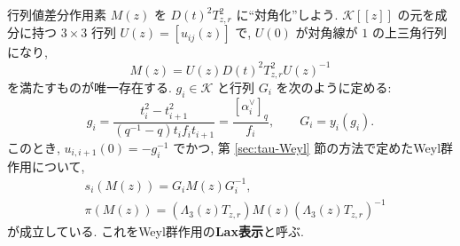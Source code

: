 \documentclass[12pt,twoside,dvipdfm]{msjproc}
\theoremstyle{definition} %
\theoremstyle{definition} %
\theoremstyle{definition} %
\numberwithin{theorem}{section}
\numberwithin{equation}{section}
\numberwithin{figure}{section}
\numberwithin{table}{section}
\newcommand\secref[1]{第 \ref{#1} 節}
\newcommand\K{\mathcal{K}}
\newcommand\av{\alpha^\vee}
\begin{document}
行列値差分作用素 $M(z)$ を $D(t)^2T_{z,r}^2$ に``対角化''しよう.
$\K[[z]]$ の元を成分に持つ $3\times 3$ 行列 $U(z)=[u_{ij}(z)]$ で, 
$U(0)$ が対角線が $1$ の上三角行列になり, 
\begin{equation*}
  M(z) = U(z)D(t)^2T_{z,r}^2U(z)^{-1}
\end{equation*}
を満たすものが唯一存在する.
$g_i\in\K$ と行列 $G_i$ を次のように定める:
\begin{equation*}
 g_i 
 = \frac{t_i^2-t_{i+1}^2}{(q^{-1}-q)t_if_it_{i+1}} 
 = \frac{[\av_i]_q}{f_i}, \qquad
 G_i = y_i(g_i).
\end{equation*}
このとき, $u_{i,i+1}(0) =  -g_i^{-1}$ でかつ, 
\secref{sec:tau-Weyl}の方法で定めたWeyl群作用について,
\begin{align*}
 &
 s_i(M(z)) = G_i M(z) G_i^{-1},
 \\ &
 \pi(M(z)) = (\Lambda_3(z)T_{z,r})M(z)(\Lambda_3(z)T_{z,r})^{-1}
\end{align*}
が成立している.  これをWeyl群作用の{\bf Lax表示}と呼ぶ.
\end{document}
